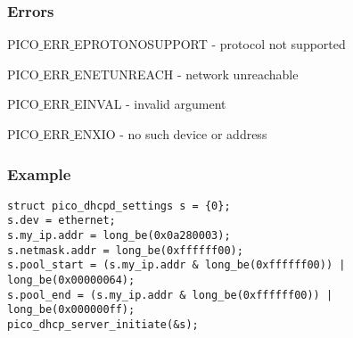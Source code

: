 \subsubsection*{Errors}
\item PICO$\_$ERR$\_$EPROTONOSUPPORT - protocol not supported
\item PICO$\_$ERR$\_$ENETUNREACH - network unreachable 
\item PICO$\_$ERR$\_$EINVAL - invalid argument
\item PICO$\_$ERR$\_$ENXIO - no such device or address

\subsubsection*{Example}
\begin{verbatim}
struct pico_dhcpd_settings s = {0};
s.dev = ethernet;
s.my_ip.addr = long_be(0x0a280003);
s.netmask.addr = long_be(0xffffff00);
s.pool_start = (s.my_ip.addr & long_be(0xffffff00)) | long_be(0x00000064);
s.pool_end = (s.my_ip.addr & long_be(0xffffff00)) | long_be(0x000000ff);
pico_dhcp_server_initiate(&s);
\end{verbatim}


